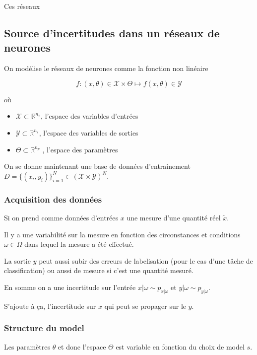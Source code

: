 \documentclass[french,12pt]{article}
\begin{document}
Ces réseaux

\subsection{Source d'incertitudes dans un réseaux de neurones}

On modélise le réseaux de neurones comme la fonction non linéaire

$$f : (x, \theta) \in \mathcal{X} \times \Theta \mapsto f(x, \theta) \in \mathcal{Y}$$

où

\begin{itemize}
    \item $\mathcal{X} \subset \mathbb{R}^{n_e}$, l'espace des variables d'entrées
    \item $\mathcal{Y} \subset \mathbb{R}^{n_s}$, l'espace des variables de sorties
    \item $\Theta \subset \mathbb{R}^{n_p}$ , l'espace des paramètres
\end{itemize}

On se donne maintenant une base de données d'entrainement
$D = \{ (x_i, y_i)\}_{i = 1}^N \in (\mathcal{X} \times \mathcal{Y})^N$.

\subsubsection{Acquisition des données}
Si on prend comme données d'entrées $x$ une mesure d'une quantité réel $\tilde{x}$.

Il y a une variabilité sur la mesure en fonction des circonstances
et conditions $\omega \in \Omega$ dans lequel la mesure a été effectué.

La sortie $y$ peut aussi subir des erreurs de labelisation
(pour le cas d'une tâche de classification) ou aussi de mesure si c'est une quantité mesuré.

En somme on a une incertitude sur l'entrée $x | \omega \sim p_{x | \omega}$
et $y | \omega \sim p_{y | \omega}$.

S'ajoute à ça, l'incertitude sur $x$ qui peut se propager sur le $y$.

\subsubsection{Structure du model}

Les paramètres $\theta$ et donc l'espace $\Theta$ est variable en fonction du choix de model $s$.
\end{document}
